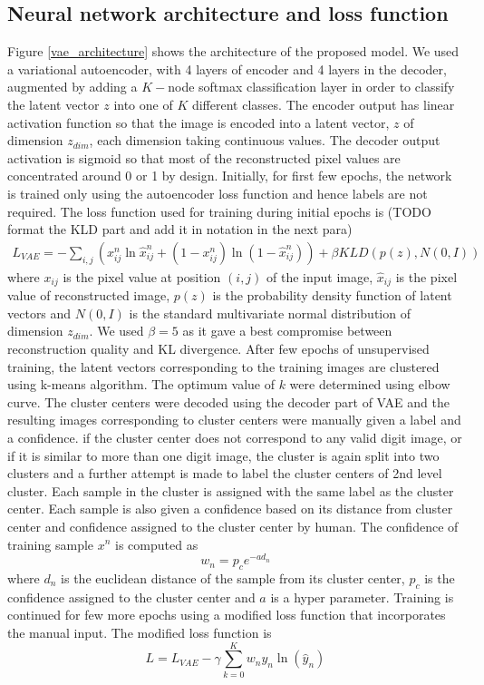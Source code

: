 \documentclass{uai2021} %
\begin{document}
\subsection{Neural network architecture and loss function}
Figure \ref{vae_architecture} shows the architecture of the proposed model.
We used a variational autoencoder\cite{kingma2013auto}, with 4 layers of encoder and 4 layers in the decoder, augmented by adding a $K-$node softmax classification layer in order to classify the latent vector $z$ into one of $K$ different classes.
The encoder output has linear activation function so that the image is encoded into a latent vector, $z$  of dimension $z_{dim}$, each dimension taking continuous values.
The decoder output activation is sigmoid so that most of the reconstructed pixel values  are concentrated around 0 or 1 by design.
Initially, for first few epochs, the network is trained only using the autoencoder loss function and hence labels are not required.
The loss function used for training during initial epochs is (TODO format the KLD part and add it in notation in the next para)
\begin{multline}
L_{VAE} = -\sum_{i, j}(x_{ij}^n \ln \hat{x}_{ij}^n + (1 - x_{ij}^n) \ln(1 -  \hat{x}_{ij}^n ) )
    +\beta KLD(p(z), N(0,I))
\end{multline}
where   $x_{ij}$ is the pixel value at position $(i, j)$ of the input image, $\hat{x}_{ij}$ is the pixel value of reconstructed image, $p(z)$ is the probability density function of latent vectors and $N(0,I)$ is the standard multivariate normal distribution of dimension $z_{dim}$.
We used $\beta = 5$ as it gave a best compromise between reconstruction quality and KL divergence.
After few epochs of unsupervised training, the latent vectors corresponding to the training images are clustered using k-means algorithm.
The optimum value of $k$ were determined using elbow curve. The cluster centers were decoded using the decoder part of VAE and the resulting images corresponding to cluster centers were manually given a label and a confidence.
if the cluster center does not correspond to any valid digit image, or if it is similar to more than one digit image, the cluster is again split into two clusters and a further attempt is made to label the cluster centers of 2nd level cluster.
Each sample in the cluster is assigned with the  same label as the cluster center. Each sample is also given a confidence based on its distance from cluster center and  confidence assigned to the cluster center by human.
The confidence of  training sample $x^n$ is computed as
\begin{equation}
w_n = p_ce^{-a d_n}
\end{equation}
where $d_n$ is the euclidean distance of the sample from its cluster center, $p_c$  is the confidence assigned to the cluster center and $a$ is a hyper parameter.
Training is continued for few more epochs using a modified loss function that incorporates the manual input. The modified loss function is
\begin{equation}
L = L_{VAE}  - \gamma \sum_{k=0}^{K}w_{n}y_{n}\ln(\hat{y}_{n})
\end{equation}
\end{document}
